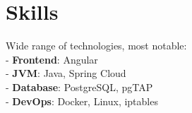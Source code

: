 \section*{Skills}
{ %
  Wide range of technologies, most notable:\\
  - \textbf{Frontend}: Angular\\
  - \textbf{JVM}: Java, Spring Cloud\\
  - \textbf{Database}: PostgreSQL, pgTAP\\
  - \textbf{DevOps}: Docker, Linux, iptables
}

